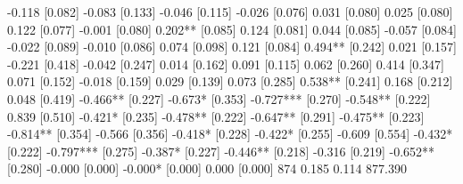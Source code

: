 -0.118 [0.082] -0.083 [0.133] -0.046 [0.115] -0.026 [0.076] 0.031 [0.080] 0.025 [0.080] 0.122 [0.077] -0.001 [0.080] 0.202** [0.085] 0.124 [0.081] 0.044 [0.085] -0.057 [0.084] -0.022 [0.089] -0.010 [0.086] 0.074 [0.098] 0.121 [0.084] 0.494** [0.242] 0.021 [0.157] -0.221 [0.418] -0.042 [0.247] 0.014 [0.162] 0.091 [0.115] 0.062 [0.260] 0.414 [0.347] 0.071 [0.152] -0.018 [0.159] 0.029 [0.139] 0.073 [0.285] 0.538** [0.241] 0.168 [0.212] 0.048 [0.419] -0.466** [0.227] -0.673* [0.353] -0.727*** [0.270] -0.548** [0.222] 0.839 [0.510] -0.421* [0.235] -0.478** [0.222] -0.647** [0.291] -0.475** [0.223] -0.814** [0.354] -0.566 [0.356] -0.418* [0.228] -0.422* [0.255] -0.609 [0.554] -0.432* [0.222] -0.797*** [0.275] -0.387* [0.227] -0.446** [0.218] -0.316 [0.219] -0.652** [0.280] -0.000 [0.000] -0.000* [0.000] 0.000 [0.000] 874 0.185 0.114 877.390